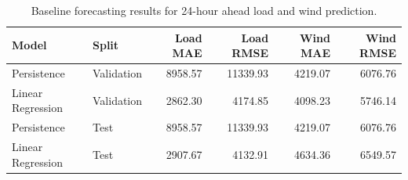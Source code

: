 \begin{table}[t]
  \centering
  \caption{Baseline forecasting results for 24-hour ahead load and wind prediction.}
  \label{tab:baseline_results}
  \begin{tabular}{llrrrr}
    \toprule
    \textbf{Model} & \textbf{Split} & \textbf{Load MAE} & \textbf{Load RMSE} & \textbf{Wind MAE} & \textbf{Wind RMSE} \\
    \midrule
    Persistence & Validation & 8958.57 & 11339.93 & 4219.07 & 6076.76 \\
    Linear Regression & Validation & 2862.30 & 4174.85 & 4098.23 & 5746.14 \\
    Persistence & Test & 8958.57 & 11339.93 & 4219.07 & 6076.76 \\
    Linear Regression & Test & 2907.67 & 4132.91 & 4634.36 & 6549.57 \\
    \bottomrule
  \end{tabular}
\end{table}

